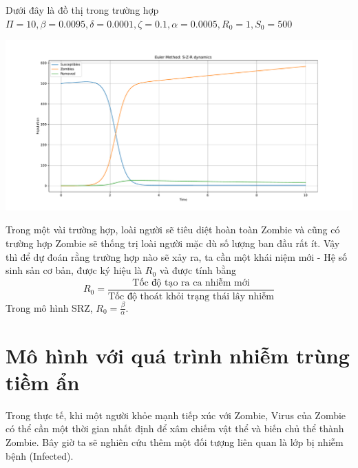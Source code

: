 \documentclass[12pt]{scrartcl}
\begin{document}
Dưới đây là đồ thị trong trường hợp $\Pi = 10,
\beta = 0.0095,
\delta = 0.0001,
\zeta = 0.1,
\alpha = 0.0005, R_0 = 1, S_0 = 500$
\begin{center}
    \includegraphics[width=1\textwidth]{Figure_1.pdf}
\end{center}

Trong một vài trường hợp, loài người sẽ tiêu diệt hoàn toàn Zombie và cũng có trường hợp Zombie sẽ thống trị loài người mặc dù số lượng ban đầu rất ít. Vậy thì để dự đoán rằng trường hợp nào sẽ xảy ra, ta cần một khái niệm mới - Hệ số sinh sản cơ bản, được ký hiệu là $R_0$ và được tính bằng 
\[
    R_0 = \frac{\text{Tốc độ tạo ra ca nhiễm mới}}{\text{Tốc độ thoát khỏi trạng thái lây nhiễm}} 
\]
Trong mô hình SRZ, $R_0 = \frac{\beta}{\alpha}$. 
\section{Mô hình với quá trình nhiễm trùng tiềm ẩn}
 Trong thực tế, khi một người khỏe mạnh tiếp xúc với Zombie, Virus của Zombie có thể cần một thời gian nhất định để xâm chiếm vật thể và biến chủ thể thành Zombie. Bây giờ ta sẽ nghiên cứu thêm một đối tượng liên quan là lớp bị nhiễm bệnh (Infected).
\end{document}
